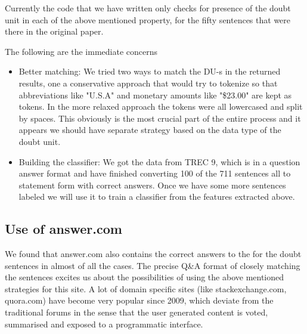 \documentclass[12pt]{article}
\begin{document}
Currently the code that we have written only checks for presence of the doubt unit in each of the above mentioned property, for the fifty sentences that were there in the original paper. 

The following are the immediate concerns 
\begin{itemize}
\item Better matching: We tried two ways to match the DU-s in the returned results, one a conservative approach that would try to tokenize so that abbreviations like "U.S.A" and monetary amounts like "\$23.00" are kept as tokens. In the more relaxed approach the tokens were all lowercased and split by spaces. This obviously is the most crucial part of the entire process and it appears we should have separate strategy based on the data type of the doubt unit.
\item Building the classifier: We got the data from TREC 9, which is in a question answer format and have finished converting 100 of the 711 sentences all to statement form with correct answers. Once we have some more sentences labeled we will use it to train a classifier from the features extracted above.
\end{itemize} 

% 
\subsection{Use of answer.com}
We found that answer.com also contains the correct answers to the for the doubt sentences in almost of all the cases. The precise Q\&A format of closely matching the sentences excites us about the possibilities of using the above mentioned strategies for this site. A lot of domain specific sites (like stackexchange.com, quora.com) have become very popular since 2009, which deviate from the traditional forums in the sense that the user generated content is voted, summarised and exposed to a programmatic interface. 
\end{document}
